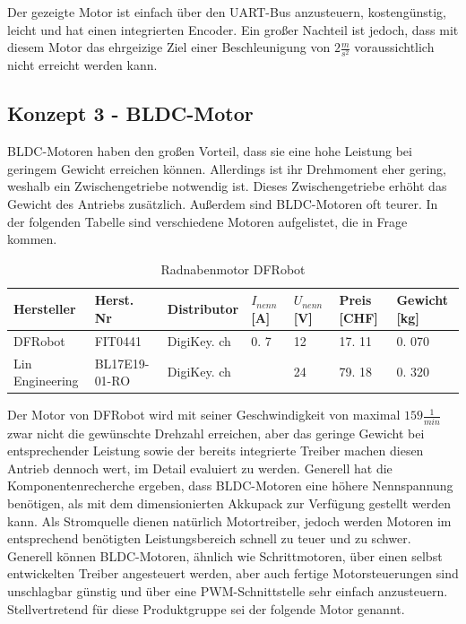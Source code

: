 \documentclass[main.  tex]{subfiles} %
\begin{document}
Der gezeigte Motor ist einfach über den UART-Bus anzusteuern, kostengünstig,
leicht und hat einen integrierten Encoder. Ein großer Nachteil ist jedoch, dass
mit diesem Motor das ehrgeizige Ziel einer Beschleunigung von $2 \frac{m}{s^2}$
voraussichtlich nicht erreicht werden kann.

\subsection*{Konzept 3 - BLDC-Motor} %

BLDC-Motoren haben den großen Vorteil, dass sie eine hohe Leistung bei geringem
Gewicht erreichen können. Allerdings ist ihr Drehmoment eher gering, weshalb
ein Zwischengetriebe notwendig ist. Dieses Zwischengetriebe erhöht das Gewicht
des Antriebs zusätzlich. Außerdem sind BLDC-Motoren oft teurer. In der
folgenden Tabelle sind verschiedene Motoren aufgelistet, die in Frage kommen.

\begin{table}[h]
    \centering
    \begin{tabular}{|p{2cm}|p{3cm}|p{2cm}|p{1cm}|p{1cm}|p{1cm}|p{}|}
        \hline
        Hersteller      & Herst.  Nr    & Distributor  & $I_{nenn} $ [A] & $U_{nenn}$ [V] & Preis [CHF] & Gewicht [kg] \\ \hline
        DFRobot         & FIT0441       & DigiKey.  ch & 0.  7           & 12             & 17.  11     & 0.  070      \\ \hline
        Lin Engineering & BL17E19-01-RO & DigiKey.  ch &                 & 24             & 79.  18     & 0.  320      \\ \hline
    \end{tabular}
    \caption{Radnabenmotor DFRobot}
\end{table}

Der Motor von DFRobot wird mit seiner Geschwindigkeit von maximal $159
    \frac{1}{min}$ zwar nicht die gewünschte Drehzahl erreichen, aber das geringe
Gewicht bei entsprechender Leistung sowie der bereits integrierte Treiber
machen diesen Antrieb dennoch wert, im Detail evaluiert zu werden. Generell hat
die Komponentenrecherche ergeben, dass BLDC-Motoren eine höhere Nennspannung
benötigen, als mit dem dimensionierten Akkupack zur Verfügung gestellt werden
kann. Als Stromquelle dienen natürlich Motortreiber, jedoch werden Motoren im
entsprechend benötigten Leistungsbereich schnell zu teuer und zu schwer.
Generell können BLDC-Motoren, ähnlich wie Schrittmotoren, über einen selbst
entwickelten Treiber angesteuert werden, aber auch fertige Motorsteuerungen
sind unschlagbar günstig und über eine PWM-Schnittstelle sehr einfach
anzusteuern. Stellvertretend für diese Produktgruppe sei der folgende Motor
genannt.
\end{document}
